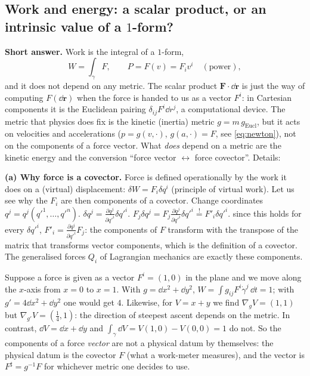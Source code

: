 \subsection{Work and energy: a scalar product, or an intrinsic value of a $1$-form?}\label{sec:phys-work}

\textbf{Short answer.} Work is the integral of a $1$-form,
\begin{equation}\label{eq:work}
W=\int_\gamma F,\qquad P=F(v)=F_iv^i\quad(\text{power}),
\end{equation}
and it does not depend on any metric. The scalar product $\mathbf F\cdot\dd\mathbf r$ is just the way of computing $F(\dd\mathbf r)$ when the force is handed to us as a vector $F^i$: in Cartesian components it is the Euclidean pairing $\delta_{ij}F^i\dd r^j$, a computational device.
The metric that physics does fix is the kinetic (inertia) metric $g=m\,g_{\mathrm{Eucl}}$, but it acts on velocities and accelerations ($p=g(v,\cdot)$, $g(a,\cdot)=F$, see \eqref{eq:newton}), not on the components of a force vector. What \emph{does} depend on a metric are the kinetic energy and the conversion ``force vector $\leftrightarrow$ force covector''. Details:

\textbf{(a) Why force is a covector.} Force is defined operationally by the work it does on a (virtual) displacement: $\delta W=F_i\delta q^i$ (principle of virtual work). Let us see why the $F_i$ are then components of a covector. Change coordinates $q^j=q^j(q'^1,\dots,q'^n)$.
 $\delta q^j=\frac{\partial q^j}{\partial q'^i}\delta q'^i$.
 $F_j\delta q^j=F_j\frac{\partial q^j}{\partial q'^i}\delta q'^i\overset!=F'_i\delta q'^i$.
 since this holds for every $\delta q'^i$, $F'_i=\frac{\partial q^j}{\partial q'^i}F_j$: the components of $F$ transform with the transpose of the matrix that transforms vector components, which is the definition of a covector. The generalised forces $Q_i$ of Lagrangian mechanics are exactly these components.

\begin{example}\label{ex:twometrics}
Suppose a force is given as a vector $F^i=(1,0)$ in the plane and we move along the $x$-axis from $x=0$ to $x=1$. With $g=\dd x^2+\dd y^2$, $W=\int g_{ij}F^i\dot\gamma^j\,\dd t=1$; with $g'=4\dd x^2+\dd y^2$ one would get $4$.
Likewise, for $V=x+y$ we find $\nabla_gV=(1,1)$ but $\nabla_{g'}V=(\frac14,1)$: the direction of steepest ascent depends on the metric. In contrast, $\dd V=\dd x+\dd y$ and $\int_\gamma\dd V=V(1,0)-V(0,0)=1$ do not.
So the components of a force \emph{vector} are not a physical datum by themselves: the physical datum is the covector $F$ (what a work-meter measures), and the vector is $F^\sharp=g^{-1}F$ for whichever metric one decides to use.
\end{example}

